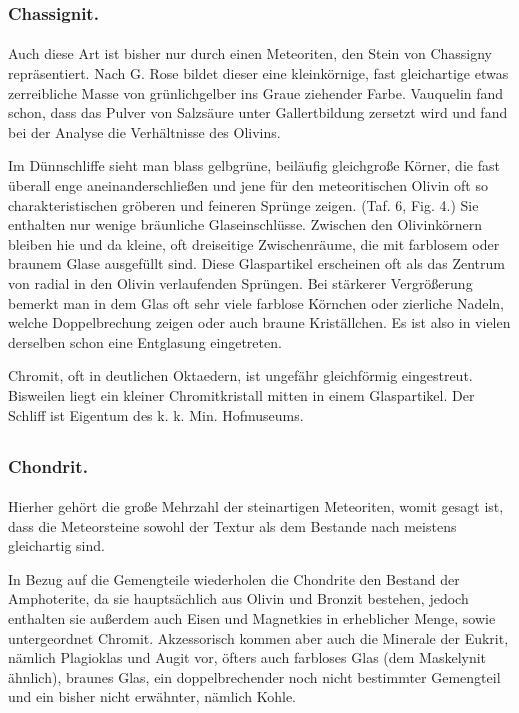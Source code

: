 \documentclass[a4paper, 12pt, oneside]{article}
\begin{document}
\subsubsection{Chassignit.}
\paragraph{}
Auch diese Art ist bisher nur durch einen Meteoriten, den Stein von Chassigny repräsentiert. Nach G. Rose bildet dieser eine kleinkörnige, fast gleichartige etwas zerreibliche Masse von grünlichgelber ins Graue ziehender Farbe. Vauquelin fand schon, dass das Pulver von Salzsäure unter Gallertbildung zersetzt wird und fand bei der Analyse die Verhältnisse des Olivins.

Im Dünnschliffe sieht man blass gelbgrüne, beiläufig gleichgroße Körner, die fast überall enge aneinanderschließen und jene für den meteoritischen Olivin oft so charakteristischen gröberen und feineren Sprünge zeigen. (Taf. 6, Fig. 4.) Sie enthalten nur wenige bräunliche Glaseinschlüsse. Zwischen den Olivinkörnern bleiben hie und da kleine, oft dreiseitige Zwischenräume, die mit farblosem oder braunem Glase ausgefüllt sind. Diese Glaspartikel erscheinen oft als das Zentrum von radial in den Olivin verlaufenden Sprüngen. Bei stärkerer Vergrößerung bemerkt man in dem Glas oft sehr viele farblose Körnchen oder zierliche Nadeln, welche Doppelbrechung zeigen oder auch braune Kriställchen. Es ist also in vielen derselben schon eine Entglasung eingetreten.

Chromit, oft in deutlichen Oktaedern, ist ungefähr gleichförmig eingestreut. Bisweilen liegt ein kleiner Chromitkristall mitten in einem Glaspartikel. Der Schliff ist Eigentum des k. k. Min. Hofmuseums.
\clearpage
\subsection{}
\subsubsection{Chondrit.}
\paragraph{}
Hierher gehört die große Mehrzahl der steinartigen Meteoriten, womit gesagt ist, dass die Meteorsteine sowohl der Textur als dem Bestande nach meistens gleichartig sind.

In Bezug auf die Gemengteile wiederholen die Chondrite den Bestand der Amphoterite, da sie hauptsächlich aus Olivin und Bronzit bestehen, jedoch enthalten sie außerdem auch Eisen und Magnetkies in erheblicher Menge, sowie untergeordnet Chromit. Akzessorisch kommen aber auch die Minerale der Eukrit, nämlich Plagioklas und Augit vor, öfters auch farbloses Glas (dem Maskelynit ähnlich), braunes Glas, ein doppelbrechender noch nicht bestimmter Gemengteil und ein bisher nicht erwähnter, nämlich Kohle.
\end{document}
